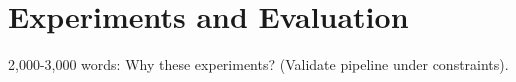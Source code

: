 \section{Experiments and Evaluation}
\label{sec:experiments}

2,000-3,000 words: Why these experiments? (Validate pipeline under constraints).





